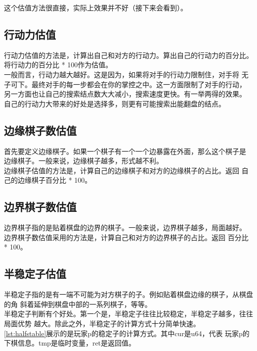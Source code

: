 \documentclass[a4paper]{article}
\begin{document}
这个估值方法很直接，实际上效果并不好（接下来会看到）。\\

\subsection{行动力估值}
行动力估值的方法是，计算出自己和对方的行动力。算出自己的行动力的百分比。
将行动力的百分比 * 100作为估值。 \\

一般而言，行动力越大越好。这是因为，如果将对手的行动力限制住，对手将
无子可下。最终对手的每一步都会在你的掌控之中。这一方面限制了对手的行动，
另一方面也让自己的搜索结点数大大减小，搜索速度更快。有一举两得的效果。\\

自己的行动力大带来的好处是选择多，则更有可能搜索出能翻盘的结点。

\subsection{边缘棋子数估值}
首先要定义边缘棋子。如果一个棋子有一个一个边暴露在外面，那么这个棋子是
边缘棋子。一般来说，边缘棋子越多，形式越不利。\\

边缘棋子估值的方法是，计算自己的边缘棋子和对方的边缘棋子的占比。返回
自己的边缘棋子百分比 * 100。

\subsection{边界棋子数估值}
边界棋子指的是贴着棋盘的边界的棋子。一般来说，边界棋子越多，局面越好。\\

边界棋子数估值采用的方法是，计算自己和对方的边界棋子的占比。返回
百分比 * 100。

\subsection{半稳定子估值}
半稳定子指的是有一端不可能为对方棋子的子。例如贴着棋盘边缘的棋子，从棋盘的角
斜着延伸到棋盘中部的一系列棋子，等等。\\

半稳定子判断有个好处。第一个是，半稳定子往往比较稳定，半稳定子越多，往往局面优势
越大。除此之外，半稳定子的计算方式十分简单快速。\\

\autoref{lst:halfstable}展示的是玩家p的稳定子的计算方式。其中cur是u64，代表
玩家p的下棋信息。tmp是临时变量，ret是返回值。\\
\end{document}
